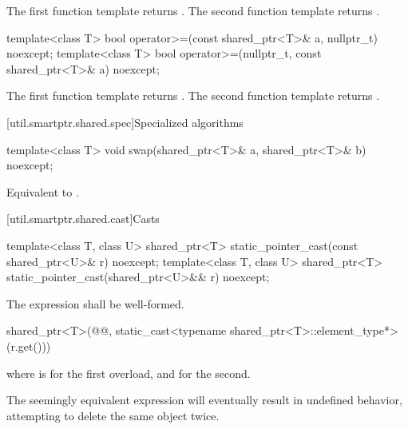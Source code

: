 \begin{itemdescr}
\pnum
\returns
The first function template returns .
The second function template returns .
\end{itemdescr}

%
\begin{itemdecl}
template<class T>
  bool operator>=(const shared_ptr<T>& a, nullptr_t) noexcept;
template<class T>
  bool operator>=(nullptr_t, const shared_ptr<T>& a) noexcept;
\end{itemdecl}

\begin{itemdescr}
\pnum
\returns
The first function template returns .
The second function template returns .
\end{itemdescr}

[util.smartptr.shared.spec]{Specialized algorithms}

%
\begin{itemdecl}
template<class T>
  void swap(shared_ptr<T>& a, shared_ptr<T>& b) noexcept;
\end{itemdecl}

\begin{itemdescr}
\pnum\effects  Equivalent to .
\end{itemdescr}

[util.smartptr.shared.cast]{Casts}

%
\begin{itemdecl}
template<class T, class U>
  shared_ptr<T> static_pointer_cast(const shared_ptr<U>& r) noexcept;
template<class T, class U>
  shared_ptr<T> static_pointer_cast(shared_ptr<U>&& r) noexcept;
\end{itemdecl}

\begin{itemdescr}
\pnum
\requires The expression  shall
be well-formed.

\pnum
\returns
\begin{codeblock}
shared_ptr<T>(@@, static_cast<typename shared_ptr<T>::element_type*>(r.get()))
\end{codeblock}
where  is  for the first overload, and
 for the second.

\pnum
\begin{note}
The seemingly equivalent expression
will eventually result in undefined behavior, attempting to delete the
same object twice.
\end{note}
\end{itemdescr}


